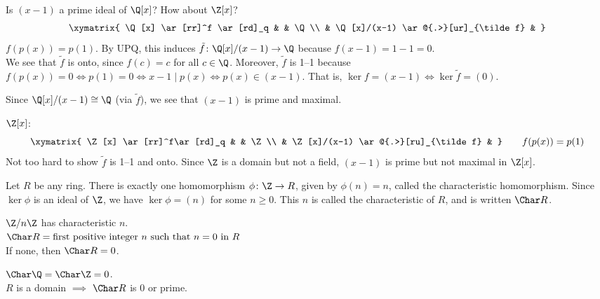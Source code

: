\eg Is $(x-1)$ a prime ideal of $\Q[x]$?  How about $\Z[x]$?
\[ \xymatrix{
\Q[x] \ar[rr]^f \ar[rd]_q & & \Q \\
 & \Q[x]/(x-1) \ar@{.>}[ur]_{\tilde f} &
} \]
$f(p(x))=p(1)$.  By UPQ, this induces $\tilde f\colon\Q[x]/(x-1)\to\Q$ because $f(x-1)=1-1=0$. \\
We see that $\tilde f$ is onto, since $f(c)=c$ for all $c\in\Q$.  Moreover, $\tilde f$ is 1--1 because $f(p(x))=0\iff p(1)=0\iff x-1\mid p(x)\iff p(x)\in(x-1)$.  That is, $\ker f=(x-1)\iff\ker\tilde f=(0)$.

Since $\Q[x]/(x-1)\cong\Q$ (via $\tilde f$), we see that $(x-1)$ is prime and maximal.

$\Z[x]$:
\[ \xymatrix{
\Z[x] \ar[rr]^f\ar[rd]_q & & \Z \\
 & \Z[x]/(x-1) \ar@{.>}[ru]_{\tilde f} &
} \qquad f(p(x)) = p(1) \]
Not too hard to show $\tilde f$ is 1--1 and onto.  Since $\Z$ is a domain but not a field, $(x-1)$ is prime but not maximal in $\Z[x]$.

Let $R$ be any ring.  There is exactly one homomorphism $\phi\colon\Z\to R$, given by $\phi(n)=n$, called the characteristic homomorphism.  Since $\ker\phi$ is an ideal of $\Z$, we have $\ker\phi=(n)$ for some $n\geq0$.  This $n$ is called the characteristic of $R$, and is written $\Char R$.

$\Z/n\Z$ has characteristic $n$. \\
$\Char R=\text{first positive integer $n$ such that $n=0$ in $R$}$ \\
If none, then $\Char R=0$.

\eg $\Char\Q=\Char\Z=0$. \\
\fact $R$ is a domain $\implies$ $\Char R$ is $0$ or prime.
